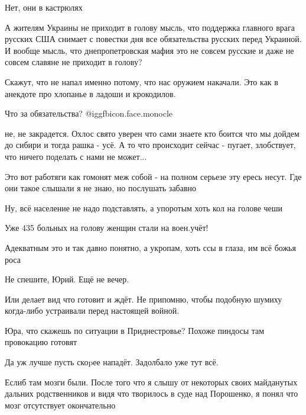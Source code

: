 \begin{multicols}{2}
Нет, они в кастрюлях


А жителям Украины не приходит в голову мысль, что поддержка главного врага
русских США снимает с повестки дня все обязательства русских перед Украиной. И
вообще мысль, что днепропетровская мафия это не совсем русские и даже не совсем
славяне не приходит в голову?


Скажут, что не напал именно потому, что нас оружием накачали. Это как в
анекдоте про хлопанье в ладоши и крокодилов.


Что за обязательства?  @igg{fbicon.face.monocle} 


не, не закрадется. Охлос свято уверен что сами знаете кто боится что мы дойдем
до сибири и тогда рашка - усё. А то что происходит сейчас - пугает, злобствует,
что ничего поделать с нами не может... 

Это вот работяги как гомонят меж собой - на полном серьезе эту ересь несут. Где
они такое слышали я не знаю, но послушать забавно


Ну, всё население не надо подставлять, а упоротым хоть кол на голове чеши


Уже 435 больных на голову женщин стали на воен.учёт!


Адекватным это и так давно понятно, а укропам, хоть ссы в глаза, им всё божья роса


Не спешите, Юрий. Ещё не вечер.


Или делает вид что готовит и ждёт. Не припомню, чтобы подобную шумиху
когда-либо устраивали перед настоящей войной.


Юра, что скажешь по ситуации в Приднестровье? Похоже пиндосы там провокацию готовят


Да уж лучше пусть скоpее нападёт. Задолбало уже тут всё.


Еслиб там мозги были. После того что я слышу от некоторых своих майданутых
дальних родственников и видя что творилось в суде над Порошенко, я понял что
мозг отсутствует окончательно


\end{multicols}
